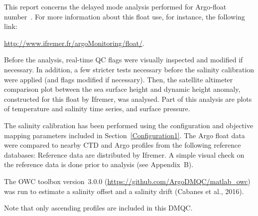 \documentclass{article}
\begin{document}
This report concerns the delayed mode analysis performed for Argo-float
number~\WMOnum. For more information about this float use, for instance,
the following link:
\begin{center}
\href{url}{http://www.ifremer.fr/argoMonitoring/float/\WMOnum}.  
\end{center}
Before the analysis, real-time QC flags were visually inspected and
modified if necessary.  In addition, a few stricter tests necessary before
the salinity calibration were applied (and flags modified if necessary).
%
Then, the satellite altimeter comparison plot between the sea surface
height and dynamic height anomaly, constructed for this float by Ifremer,
was analysed.
%
Part of this analysis are plots of temperature and salinity time
series, and surface pressure. %



The salinity calibration has been performed using the configuration and objective
mapping parameters included in Section~\ref{Configuration1}.
The Argo float data were compared to nearby CTD and Argo profiles from the
following reference databases: \texttt{} Reference
data are distributed by Ifremer.  A simple visual check on the reference
data is done prior to analysis (see Appendix~B).

The OWC toolbox version~3.0.0 %
(\href{url}{https://github.com/ArgoDMQC/matlab\_owc}) was run to estimate
a salinity offset and a salinity drift (Cabanes et al., 2016).

Note that only ascending profiles are included in this DMQC.
\end{document}
